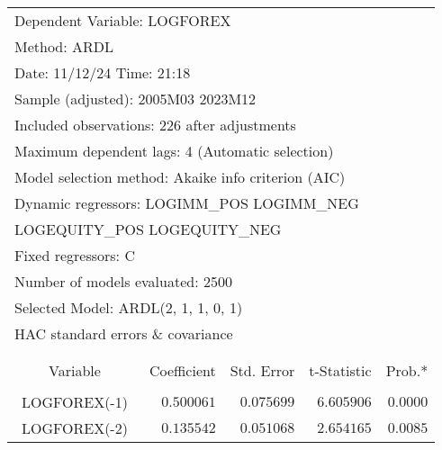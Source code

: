 \begin{tabular}{lrrrr}
\multicolumn{3}{l}{Dependent Variable: LOGFOREX}&\multicolumn{1}{c}{}&\multicolumn{1}{c}{}\\
\multicolumn{1}{l}{Method: ARDL}&\multicolumn{1}{c}{}&\multicolumn{1}{c}{}&\multicolumn{1}{c}{}&\multicolumn{1}{c}{}\\
\multicolumn{2}{l}{Date: 11/12/24   Time: 21:18}&\multicolumn{1}{c}{}&\multicolumn{1}{c}{}&\multicolumn{1}{c}{}\\
\multicolumn{3}{l}{Sample (adjusted): 2005M03 2023M12}&\multicolumn{1}{c}{}&\multicolumn{1}{c}{}\\
\multicolumn{4}{l}{Included observations: 226 after adjustments}&\multicolumn{1}{c}{}\\
\multicolumn{4}{l}{Maximum dependent lags: 4 (Automatic selection)}&\multicolumn{1}{c}{}\\
\multicolumn{4}{l}{Model selection method: Akaike info criterion (AIC)}&\multicolumn{1}{c}{}\\
\multicolumn{6}{l}{Dynamic regressors: LOGIMM\_POS LOGIMM\_NEG}\\
\multicolumn{3}{l}{LOGEQUITY\_POS LOGEQUITY\_NEG}&\multicolumn{1}{c}{}&\multicolumn{1}{c}{}\\
\multicolumn{1}{l}{Fixed regressors: C}&\multicolumn{1}{c}{}&\multicolumn{1}{c}{}&\multicolumn{1}{c}{}&\multicolumn{1}{c}{}\\
\multicolumn{3}{l}{Number of models evaluated: 2500}&\multicolumn{1}{c}{}&\multicolumn{1}{c}{}\\
\multicolumn{3}{l}{Selected Model: ARDL(2, 1, 1, 0, 1)}&\multicolumn{1}{c}{}&\multicolumn{1}{c}{}\\
\multicolumn{6}{l}{HAC standard errors \& covariance}\\
{}&\multicolumn{1}{c}{}&\multicolumn{1}{c}{}\\
[4.5pt] \hline \\ [-4.5pt]
\multicolumn{1}{c}{Variable}&\multicolumn{1}{r}{Coefficient}&\multicolumn{1}{r}{Std. Error}&\multicolumn{1}{r}{t-Statistic}&\multicolumn{1}{r}{Prob.*}\\
[4.5pt] \hline \\ [-4.5pt]
\multicolumn{1}{c}{LOGFOREX(-1)}&\multicolumn{1}{r}{$0.500061$}&\multicolumn{1}{r}{$0.075699$}&\multicolumn{1}{r}{$6.605906$}&\multicolumn{1}{r}{$0.0000$}\\
\multicolumn{1}{c}{LOGFOREX(-2)}&\multicolumn{1}{r}{$0.135542$}&\multicolumn{1}{r}{$0.051068$}&\multicolumn{1}{r}{$2.654165$}&\multicolumn{1}{r}{$0.0085$}\\

\end{tabular}
